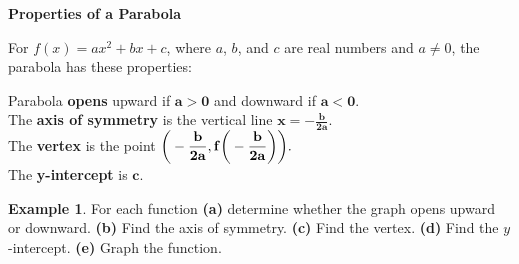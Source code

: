 \documentclass{report}
\theoremstyle{definition}
\newtheorem{example}{\bf Example}
\begin{document}
 \newpage

\noindent \large\textbf{Properties of a Parabola}\normalsize\\

\vspace{-0.5cm}

\noindent For $f(x) = ax^2+bx+c$, where $a$, $b$, and $c$ are real numbers and $a\neq 0$, the parabola has these properties:\\

\vspace{-0.5cm}

\noindent Parabola \textbf{\color{red}opens\color{black}} upward if $\mathbf{a>0}$ and downward if $\mathbf{a<0}$.\\
The \textbf{\color{red}axis of symmetry\color{black}} is the vertical line $\mathbf{x=\displaystyle-\frac{b}{2a}}$.\\
The \textbf{\color{red}vertex\color{black}} is the point $\mathbf{\bigg{(}\displaystyle-\frac{b}{2a}, f\bigg{(}-\frac{b}{2a}\bigg{)}\bigg{)}.}$\\
The \textbf{\color{red}y-intercept\color{black}} is $\mathbf{c}$.

\begin{example}
For each function \textbf{(a)} determine whether the graph opens upward or downward. \textbf{(b)} Find the axis of symmetry. \textbf{(c)} Find the vertex. \textbf{(d)} Find the $y$-intercept. \textbf{(e)} Graph the function.
\end{example}

\vspace{-0.25cm}
\end{document}
